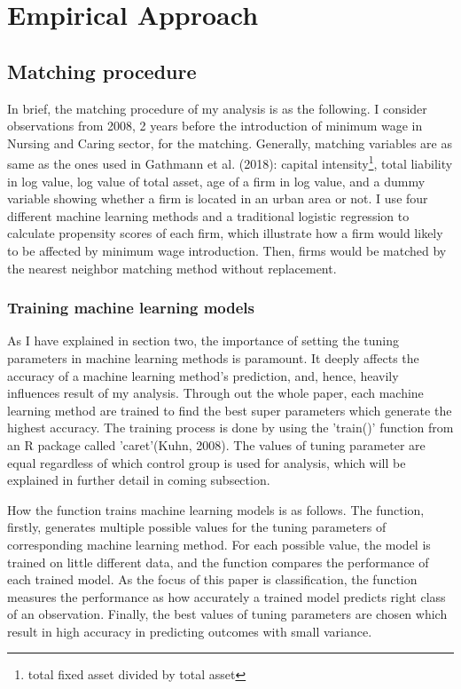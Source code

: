 \documentclass[11pt,a4paper,oneside]{article}
\begin{document}
\section{Empirical Approach}
\subsection{Matching procedure}
In brief, the matching procedure of my analysis is as the following. I consider observations from 2008, 2 years before the introduction of minimum wage in Nursing and Caring sector, for the matching. Generally, matching variables are as same as the ones used in Gathmann et al. (2018)\cite{Gathmann2018}: capital intensity\footnote{total fixed asset divided by total asset}, total liability in log value, log value of total asset, age of a firm in log value, and a dummy variable showing whether a firm is located in an urban area or not. I use four different machine learning methods and a traditional logistic regression to calculate propensity scores of each firm, which illustrate how a firm would likely to be affected by minimum wage introduction. Then, firms would be matched by the nearest neighbor matching method without replacement. 
\subsubsection{Training machine learning models}
As I have explained in section two, the importance of setting the tuning parameters in machine learning methods is paramount. It deeply affects the accuracy of a machine learning method's prediction, and, hence, heavily influences result of my analysis. Through out the whole paper, each machine learning method are trained to find the best super parameters which generate the highest accuracy. The training process is done by using the 'train()' function from an R package called 'caret'(Kuhn, 2008).\cite{JSSv028i05} The values of tuning parameter are equal regardless of which control group is used for analysis, which will be explained in further detail in coming subsection.
\par 
How the function trains machine learning models is as follows. The function, firstly, generates multiple possible values for the tuning parameters of corresponding machine learning method. For each possible value, the model is trained on little different data, and the function compares the performance of each trained model. As the focus of this paper is classification, the function measures the performance as how accurately a trained model predicts right class of an observation. Finally, the best values of tuning parameters are chosen which result in high accuracy in predicting outcomes with small variance.
\end{document}
